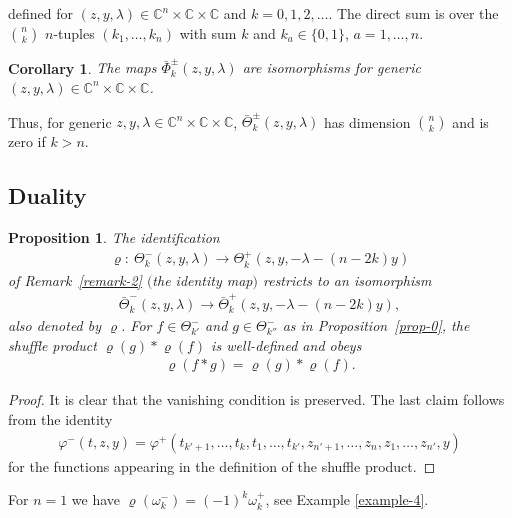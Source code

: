 \documentclass[10pt,a4paper]{amsart}
\numberwithin{equation}{section}
\newtheorem{Corollary}[Theorem]{Corollary}
\newtheorem{Proposition}[Theorem]{Proposition}
 { \theoremstyle{definition}
\newtheorem{Definition}[Theorem]{Definition}
\newtheorem{Example}[Theorem]{Example}
\newtheorem{Remark}[Theorem]{Remark} }
\begin{document}
defined for $(z,y,\lambda)\in\mathbb C^n\times \mathbb C\times \mathbb C$ and $k=0,1,2,\dots$. The direct sum is over the ${n \choose k}$ $n$-tuples $(k_1,\dots,k_n)$ with sum $k$ and $k_a\in\{0,1\}$, $a=1,\dots,n$.
\begin{Corollary}\label{cor-0} The maps $\bar\Phi_k^{\pm}(z,y,\lambda)$ are isomorphisms for generic $(z,y,\lambda)\in\mathbb C^n\times \mathbb C\times \mathbb C$.
\end{Corollary}

Thus, for generic $z,y,\lambda\in\mathbb C^n\times\mathbb C\times\mathbb C$, $\bar\Theta^\pm_k(z,y,\lambda)$ has dimension ${n \choose k}$ and is zero if $k>n$.

\subsection{Duality}\label{ss-3.4}
\begin{Proposition}\label{p-duality} The identification
\begin{gather*}
 \varrho\colon \ \Theta^-_k(z,y,\lambda)\to \Theta^+_k(z,y,-\lambda-(n-2k)y)
\end{gather*}
of Remark~{\rm \ref{remark-2}} $($the identity map$)$ restricts to an isomorphism
\begin{gather*}
 \bar \Theta^-_k(z,y,\lambda)\to \bar\Theta^+_k(z,y,-\lambda-(n-2k)y),
\end{gather*}
also denoted by $\varrho$. For $f\in\Theta^-_{k'}$ and $g\in\Theta^-_{k''}$ as in Proposition~{\rm \ref{prop-0}}, the shuffle product $\varrho(g)*\varrho(f)$ is well-defined and obeys
\begin{gather*}
 \varrho(f*g)=\varrho(g)*\varrho(f).
\end{gather*}
\end{Proposition}
\begin{proof} It is clear that the vanishing condition is preserved. The last claim follows from the identity
 \begin{gather*}
 \varphi^-(t,z,y)= \varphi^+(t_{k'+1},\dots,t_k,t_1,\dots,t_{k'},z_{n'+1},\dots,z_n,z_1,\dots,z_{n'},y)
 \end{gather*}
 for the functions appearing in the definition of the shuffle product.
\end{proof}

\begin{Remark}\label{remark-4} For $n=1$ we have $\varrho(\omega^-_k)=(-1)^k\omega^+_k$, see Example \ref{example-4}.
\end{Remark}
\end{document}
